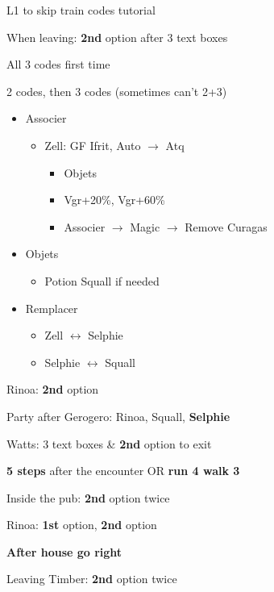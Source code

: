 L1 to skip train codes tutorial

When leaving: \textbf{2nd} option after 3 text boxes

All 3 codes first time

2 codes, then 3 codes (sometimes can't 2+3)\vfill

\begin{menu}
	\begin{itemize}
		\item Associer
			\begin{itemize}
				\item Zell: GF Ifrit, Auto $\rightarrow$ Atq
					\begin{itemize}
						\item Objets
						\item Vgr+20\%, Vgr+60\%
						\item Associer $\rightarrow$ Magic $\rightarrow$ Remove Curagas
					\end{itemize}
			\end{itemize}
		\item Objets
			\begin{itemize}
				\item Potion Squall if needed
			\end{itemize}
		\item Remplacer
			\begin{itemize}
				\item Zell $\leftrightarrow$ Selphie
				\item Selphie $\leftrightarrow$ Squall
			\end{itemize}
	\end{itemize}
\end{menu}

Rinoa: \textbf{2nd} option

Party after Gerogero: Rinoa, Squall, \textbf{Selphie}

Watts: 3 text boxes \& \textbf{2nd} option to exit

\textbf{5 steps} after the encounter OR \textbf{run 4 walk 3}

Inside the pub: \textbf{2nd} option twice

Rinoa: \textbf{1st} option, \textbf{2nd} option

\textbf{After house go right}

Leaving Timber: \textbf{2nd} option twice

